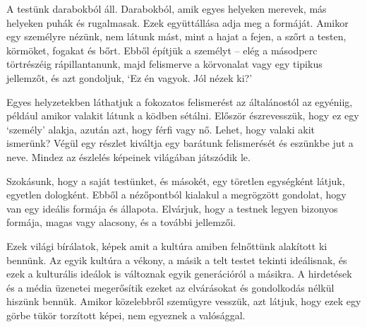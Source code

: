 A testünk darabokból áll. Darabokból, amik egyes helyeken merevek, más
helyeken puhák és rugalmasak. Ezek együttállása adja meg a formáját.
Amikor egy személyre nézünk, nem látunk mást, mint a hajat a fejen, a
szőrt a testen, körmöket, fogakat és bőrt. Ebből építjük a személyt --
elég a másodperc törtrészéig rápillantanunk, majd felismerve a
körvonalat vagy egy tipikus jellemzőt, és azt gondoljuk, `Ez én vagyok.
Jól nézek ki?'

Egyes helyzetekben láthatjuk a fokozatos felismerést az általánostól az
egyéniig, például amikor valakit látunk a ködben sétálni. Először
észrevesszük, hogy ez egy `személy' alakja, azután azt, hogy férfi vagy
nő. Lehet, hogy valaki akit ismerünk? Végül egy részlet kiváltja egy
barátunk felismerését és eszünkbe jut a neve. Mindez az észlelés
képeinek világában játszódik le.

Szokásunk, hogy a saját testünket, és másokét, egy töretlen egységként
látjuk, egyetlen dologként. Ebből a nézőpontból kialakul a megrögzött
gondolat, hogy van egy ideális formája és állapota. Elvárjuk, hogy a
testnek legyen bizonyos formája, magas vagy alacsony, és a további
jellemzői.

Ezek világi bírálatok, képek amit a kultúra amiben felnőttünk alakított
ki bennünk. Az egyik kultúra a vékony, a másik a telt testet tekinti
ideálisnak, és ezek a kulturális ideálok is változnak egyik generációról
a másikra. A hirdetések és a média üzenetei megerősítik ezeket az
elvárásokat és gondolkodás nélkül hiszünk bennük. Amikor közelebbről
szemügyre vesszük, azt látjuk, hogy ezek egy görbe tükör torzított
képei, nem egyeznek a valósággal.

\clearpage
\figurepagelayout

